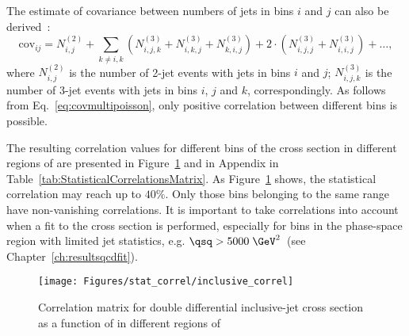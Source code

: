 The estimate of covariance between numbers of jets in bins $i$ and $j$ can also be derived~\cite{upub:juanstatcorrel}:
\begin{equation}
 \mathrm{cov}_{ij} = N_{i,j}^{\left(2\right)} + \sum_{k\neq i,k}{\left(N_{i,j,k}^{\left(3\right)} + N_{i,k,j}^{\left(3\right)} + N_{k,i,j}^{\left(3\right)} \right) + 2\cdot\left( N_{i,j,j}^{\left(3\right)} + N_{i,i,j}^{\left(3\right)} \right) + \ldots },
 \label{eq:covmultipoisson}
\end{equation}
where $N_{i,j}^{\left(2\right)}$ is the number of 2-jet events with jets in bins $i$ and $j$; $N_{i,j,k}^{\left(3\right)}$ is the number of 3-jet events with jets in bins $i$, $j$ and $k$, correspondingly. As follows from Eq.~\eqref{eq:covmultipoisson}, only positive correlation between different bins is possible.

The resulting correlation values for different bins of the \dsdetjetb cross section in different regions of \qsq are presented in Figure~\ref{fig:correlmatrix} and in Appendix in Table~\ref{tab:StatisticalCorrelationsMatrix}. As Figure~\ref{fig:correlmatrix} shows, the statistical correlation may reach up to $40\%$. Only those \etjetb bins belonging to the same \qsq range have non-vanishing correlations. It is important to take correlations into account when a fit to the cross section is performed, especially for bins in the phase-space region with limited jet statistics, e.g. $\qsq > 5000\;\GeV^2$~(see Chapter~\ref{ch:resultsqcdfit}).
\begin{figure}
	\centering
		\texttt{[image: Figures/stat\_correl/inclusive\_correl]}
	\caption{Correlation matrix for double differential inclusive-jet cross section as a function of \etjetb in different regions of \qsq}
	\label{fig:correlmatrix}
\end{figure}
